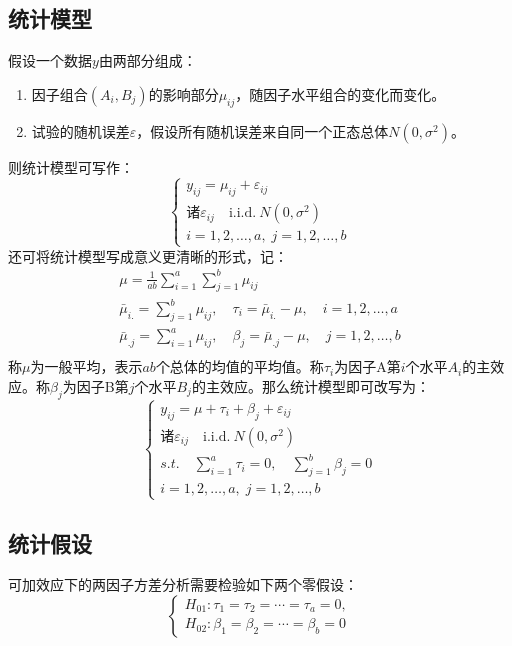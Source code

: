 \subsection{统计模型}
假设一个数据$y$由两部分组成：
\begin{enumerate}
	\item 因子组合$(A_i,B_j)$的影响部分$\mu_{ij}$，随因子水平组合的变化而变化。
	\item 试验的随机误差$\varepsilon$，假设所有随机误差来自同一个正态总体$ N(0,\sigma^2)$。
\end{enumerate}
则统计模型可写作：
\begin{equation*}
	\begin{cases}
		y_{ij}=\mu_{ij}+\varepsilon_{ij} \\
		\text{诸}\varepsilon_{ij}\quad\mathrm{i.i.d.~}N(0,\sigma^2) \\
		i=1,2,\dots,a,\;j=1,2,\dots,b
	\end{cases}
\end{equation*}
还可将统计模型写成意义更清晰的形式，记：
\begin{gather*}
	\mu=\frac{1}{ab}\sum_{i=1}^a\sum_{j=1}^b\mu_{ij} \\
	\bar{\mu}_{i.}=\sum_{j=1}^b\mu_{ij},\quad\tau_i=\bar{\mu}_{i.}-\mu,\quad i=1,2,\dots,a \\
	\bar{\mu}_{.j}=\sum_{i=1}^a\mu_{ij},\quad\beta_j=\bar{\mu}_{.j}-\mu,\quad j=1,2,\dots,b \\
\end{gather*}
称$\mu$为一般平均，表示$ab$个总体的均值的平均值。称$\tau_i$为因子A第$i$个水平$A_i$的主效应。称$\beta_j$为因子B第$j$个水平$B_j$的主效应。那么统计模型即可改写为：
\begin{equation*}\label{model:additive-effect-two-way-anova}
	\begin{cases}
		y_{ij}=\mu+\tau_i+\beta_j+\varepsilon_{ij} \\
		\text{诸}\varepsilon_{ij}\quad\mathrm{i.i.d.~}N(0,\sigma^2) \\
		s.t.\quad\sum\limits_{i=1}^a\tau_i=0,\quad\sum\limits_{j=1}^b\beta_j=0 \\
		i=1,2,\dots,a,\;j=1,2,\dots,b
	\end{cases}
\end{equation*}

\subsection{统计假设}
可加效应下的两因子方差分析需要检验如下两个零假设：
\begin{equation*}
	\begin{cases}
		H_{01}:\tau_1=\tau_2=\cdots=\tau_a=0, \\
		H_{02}:\beta_1=\beta_2=\cdots=\beta_b=0
	\end{cases}
\end{equation*}

